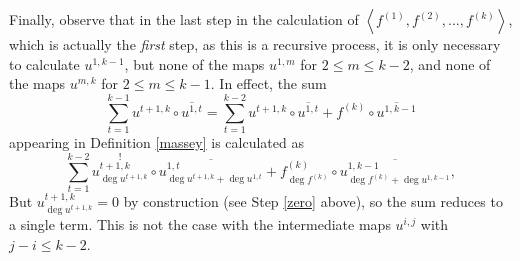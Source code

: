 \documentclass[12pt]{article}
\begin{document}
Finally, observe that in the last step in the calculation of
$\left\langle f^{\left(1\right)}, f^{\left(2\right)},\dots, 
f^{\left(k\right)}\right\rangle$,
which is actually
the {\em first} step, as this is a recursive process,
it is only necessary to calculate $u^{1,k-1}$,
but none of the maps $u^{1,m}$ for $2\le m\le k-2$,
and none of the maps $u^{m,k}$ for $2\le m\le k-1$.
In effect, the sum
\[\sum_{t=1}^{k-1}
u^{t+1,k}\circ
\overline{u^{1,t}}
=\sum_{t=1}^{k-2}
u^{t+1,k}\circ
\overline{u^{1,t}}
+f^{\left(k\right)}\circ\overline{u^{1,k-1}}
\] 
appearing in Definition \ref{massey} 
is calculated as
\[ \sum_{t=1}^{k-2}
\stackrel{!}{\boxed{u^{t+1,k}
_{\deg u^{t+1,k}}}}
\circ
\overline{u^{1,t}_{\deg u^{t+1,k}+\deg u^{1,t}}}
+f^{\left(k\right)}_{\deg f^{\left(k\right)}}
\circ\overline{u^{1,k-1}_{\deg f^{\left(k\right)}+\deg u^{1,k-1}}},
\] 
But $u^{t+1,k}_{\deg u^{t+1,k}}=0$
by construction (see Step \ref{zero} above),
so the sum reduces to a single term.
This is not the case with the intermediate maps $u^{i,j}$
with $j-i\le k-2$.



\end{document}
